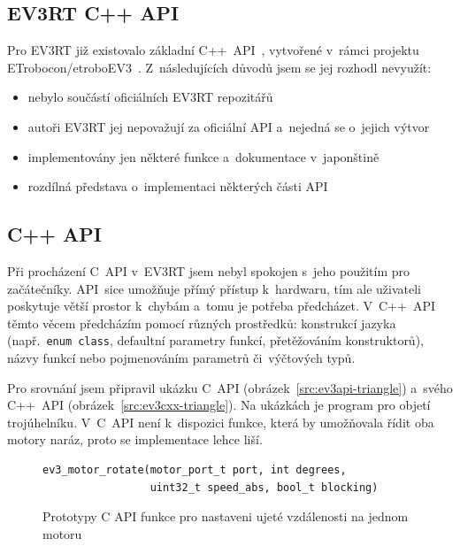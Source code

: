 \subsection{EV3RT C++ API}


Pro EV3RT již existovalo základní C++~API~\cite{EV3RT-git-web_documentation}, vytvořené v~rámci projektu ETrobocon/etroboEV3~\cite{ev3rt-cpp-API-ETrobocon}. Z~následujících důvodů jsem se jej rozhodl nevyužít:
 
\begin{itemize}
    \item nebylo součástí oficiálních EV3RT repozitářů
    \item autoři EV3RT jej nepovažují za oficiální API a~nejedná se o~jejich výtvor
    \item implementovány jen některé funkce a~dokumentace v~japonštině
    \item rozdílná představa o~implementaci některých části API     
\end{itemize}

\subsection{C++ API}

Při procházení C~API v~EV3RT jsem nebyl spokojen s~jeho použitím pro začátečníky. 
API~sice umožňuje přímý přístup k~hardwaru, tím ale uživateli poskytuje větší prostor k~chybám a~tomu
 je potřeba předcházet. 
V~C++~API těmto věcem předcházím pomocí různých prostředků: konstrukcí jazyka (např.~\texttt{enum class}, defaultní parametry funkcí, přetěžováním konstruktorů), názvy funkcí nebo pojmenováním parametrů či~výčtových typů.

Pro srovnání jsem připravil ukázku C~API (obrázek~\ref{src:ev3api-triangle}) a~svého C++~API (obrázek~\ref{src:ev3cxx-triangle}). 
Na ukázkách je program pro objetí trojúhelníku. V~C~API není k~dispozici funkce, která by umožňovala řídit oba motory naráz, proto se implementace lehce liší.


\begin{figure}[H] 
    \begin{verbatim}
ev3_motor_rotate(motor_port_t port, int degrees, 
                 uint32_t speed_abs, bool_t blocking)
    \end{verbatim}
    \caption{Prototypy C API funkce pro nastaveni ujeté vzdálenosti na jednom motoru}
    \label{src:ev3api_motor-rotate}
\end{figure}


